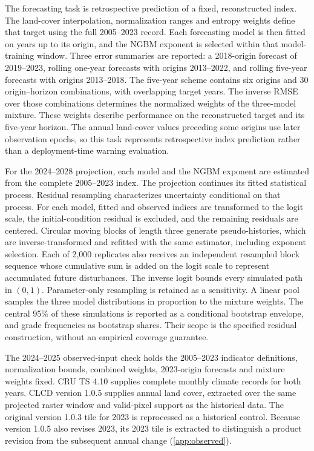 \documentclass[preprint,11pt,authoryear]{elsarticle}
\begin{document}
The forecasting task is retrospective prediction of a fixed, reconstructed index. The land-cover interpolation, normalization ranges and entropy weights define that target using the full 2005--2023 record. Each forecasting model is then fitted on years up to its origin, and the NGBM exponent is selected within that model-training window. Three error summaries are reported: a 2018-origin forecast of 2019--2023, rolling one-year forecasts with origins 2013--2022, and rolling five-year forecasts with origins 2013--2018. The five-year scheme contains six origins and 30 origin--horizon combinations, with overlapping target years. The inverse RMSE over those combinations determines the normalized weights of the three-model mixture. These weights describe performance on the reconstructed target and its five-year horizon. The annual land-cover values preceding some origins use later observation epochs, so this task represents retrospective index prediction rather than a deployment-time warning evaluation.

For the 2024--2028 projection, each model and the NGBM exponent are estimated from the complete 2005--2023 index. The projection continues its fitted statistical process. Residual resampling characterizes uncertainty conditional on that process. For each model, fitted and observed indices are transformed to the logit scale, the initial-condition residual is excluded, and the remaining residuals are centered. Circular moving blocks of length three generate pseudo-histories, which are inverse-transformed and refitted with the same estimator, including exponent selection. Each of 2,000 replicates also receives an independent resampled block sequence whose cumulative sum is added on the logit scale to represent accumulated future disturbances. The inverse logit bounds every simulated path in $(0,1)$. Parameter-only resampling is retained as a sensitivity. A linear pool samples the three model distributions in proportion to the mixture weights. The central 95\% of these simulations is reported as a conditional bootstrap envelope, and grade frequencies as bootstrap shares. Their scope is the specified residual construction, without an empirical coverage guarantee.

The 2024--2025 observed-input check holds the 2005--2023 indicator definitions, normalization bounds, combined weights, 2023-origin forecasts and mixture weights fixed. CRU TS 4.10 supplies complete monthly climate records for both years. CLCD version 1.0.5 supplies annual land cover, extracted over the same projected raster window and valid-pixel support as the historical data. The original version 1.0.3 tile for 2023 is reprocessed as a historical control. Because version 1.0.5 also revises 2023, its 2023 tile is extracted to distinguish a product revision from the subsequent annual change (\ref{app:observed}).
\end{document}
